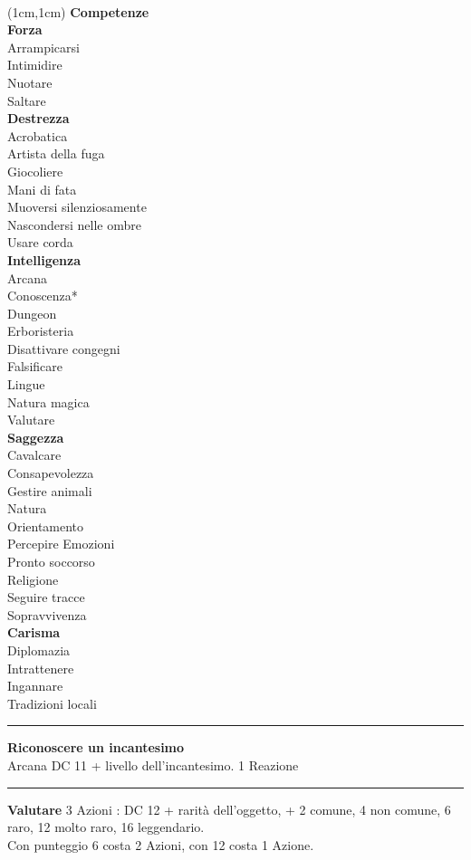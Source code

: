 \documentclass[a4paper,12 pt,openany]{book}
\newcommand{\riga}{\rule{\textwidth}{0.4pt}}
\begin{document}
~\newpage

\begin{textblock*}{4cm}(1cm,1cm) %
{\textbf{Competenze}\\
\textbf{Forza}\\
Arrampicarsi\\
Intimidire\\
Nuotare\\
Saltare	\\
\textbf{Destrezza}\\
Acrobatica\\
Artista della fuga\\
Giocoliere\\
Mani di fata\\
Muoversi silenziosamente\\
Nascondersi nelle ombre\\
Usare corda	\\
\textbf{Intelligenza}\\
Arcana\\
Conoscenza*\\
Dungeon\\
Erboristeria\\
Disattivare congegni\\
Falsificare\\
Lingue\\
Natura magica\\
Valutare\\
\textbf{Saggezza}\\
Cavalcare\\
Consapevolezza\\
Gestire animali\\
Natura\\
Orientamento\\
Percepire Emozioni\\
Pronto soccorso\\
Religione\\
Seguire tracce\\
Sopravvivenza\\
\textbf{Carisma}\\
Diplomazia\\
Intrattenere\\
Ingannare\\
Tradizioni locali
}

\riga

\textbf{Riconoscere un incantesimo}\\ Arcana DC 11 + livello dell'incantesimo. 1 Reazione

\riga

\textbf{Valutare} 3 Azioni : DC 12 + rarità dell'oggetto, + 2 comune, 4 non comune, 6 raro, 12 molto raro, 16 leggendario. \\
Con punteggio 6 costa 2 Azioni, con 12 costa 1 Azione.

\end{textblock*}
\end{document}
